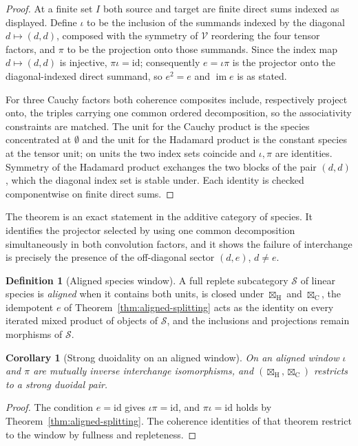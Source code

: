 \documentclass[11pt,reqno]{amsart}
\newtheorem{corollary}[theorem]{Corollary}
\theoremstyle{definition}
\newtheorem{definition}[theorem]{Definition}
\theoremstyle{remark}
\providecommand{\id}{\mathrm{id}}
\providecommand{\Hd}{\boxtimes_{\mathrm{H}}}
\providecommand{\Cy}{\boxtimes_{\mathrm{C}}}
\begin{document}
\begin{proof}
At a finite set $I$ both source and target are finite direct sums indexed
as displayed. Define $\iota$ to be the inclusion of the summands indexed
by the diagonal $d\mapsto(d,d)$, composed with the symmetry of
$\mathcal V$ reordering the four tensor factors, and $\pi$ to be the
projection onto those summands. Since the index map $d\mapsto(d,d)$ is
injective, $\pi\iota=\id$; consequently $e=\iota\pi$ is the projector
onto the diagonal-indexed direct summand, so $e^2=e$ and
$\operatorname{im} e$ is as stated.

For three Cauchy factors both coherence composites include, respectively
project onto, the triples carrying one common ordered decomposition, so
the associativity constraints are matched. The unit for the Cauchy
product is the species concentrated at $\emptyset$ and the unit for the
Hadamard product is the constant species at the tensor unit; on units the
two index sets coincide and $\iota,\pi$ are identities. Symmetry of the
Hadamard product exchanges the two blocks of the pair $(d,d)$, which the
diagonal index set is stable under. Each identity is checked
componentwise on finite direct sums.
\end{proof}

The theorem is an exact statement in the additive category of species. It
identifies the projector selected by using one common decomposition
simultaneously in both convolution factors, and it shows the failure of
interchange is precisely the presence of the off-diagonal sector
$(d,e)$, $d\ne e$.

\begin{definition}[Aligned species window]
\label{def:aligned-window}
A full replete subcategory $\mathcal S$ of linear species is
\emph{aligned} when it contains both units, is closed under $\Hd$ and
$\Cy$, the idempotent $e$ of
Theorem~\ref{thm:aligned-splitting} acts as the identity on every
iterated mixed product of objects of $\mathcal S$, and the inclusions and
projections remain morphisms of $\mathcal S$.
\end{definition}

\begin{corollary}[Strong duoidality on an aligned window]
\label{cor:aligned-duoidal}
On an aligned window $\iota$ and $\pi$ are mutually inverse interchange
isomorphisms, and $(\Hd,\Cy)$ restricts to a strong duoidal pair.
\end{corollary}

\begin{proof}
The condition $e=\id$ gives $\iota\pi=\id$, and $\pi\iota=\id$ holds by
Theorem~\ref{thm:aligned-splitting}. The coherence identities of that
theorem restrict to the window by fullness and repleteness.
\end{proof}
\end{document}
